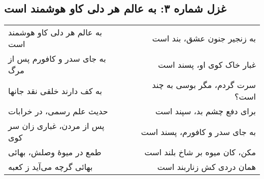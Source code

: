 \begin{center}
\section*{غزل شماره ۳: به عالم هر دلی کاو هوشمند است}
\label{sec:003}
\begin{longtable}{l p{0.5cm} r}
به عالم هر دلی کاو هوشمند است
&&
به زنجیر جنون عشق، بند است
\\
به جای سدر و کافورم پس از مرگ
&&
غبار خاک کوی او، پسند است
\\
به کف دارند خلقی نقد جانها
&&
سرت گردم، مگر بوسی به چند است؟
\\
حدیث علم رسمی، در خرابات
&&
برای دفع چشم بد، سپند است
\\
پس از مردن، غباری زان سر کوی
&&
به جای سدر و کافورم، پسند است
\\
طمع در میوهٔ وصلش، بهائی
&&
مکن، کان میوه بر شاخ بلند است
\\
بهائی گرچه می‌آید ز کعبه
&&
همان دردی کش زناربند است
\\
\end{longtable}
\end{center}
